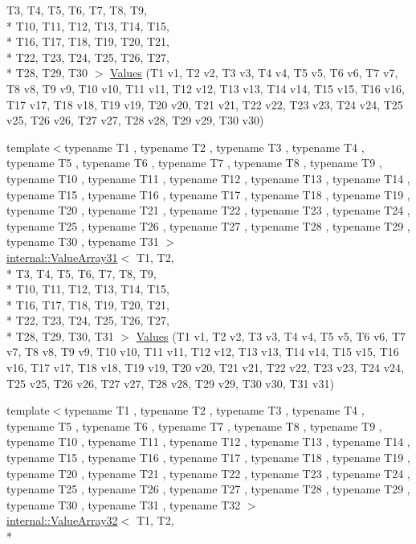 \begin{DoxyCompactItemize}
T3, T4, T5, T6, T7, T8, T9, \\*
T10, T11, T12, T13, T14, T15, \\*
T16, T17, T18, T19, T20, T21, \\*
T22, T23, T24, T25, T26, T27, \\*
T28, T29, T30 $>$ \hyperlink{namespacetesting_a016767be70ad0412bdbf837bc4d3ca98}{Values} (T1 v1, T2 v2, T3 v3, T4 v4, T5 v5, T6 v6, T7 v7, T8 v8, T9 v9, T10 v10, T11 v11, T12 v12, T13 v13, T14 v14, T15 v15, T16 v16, T17 v17, T18 v18, T19 v19, T20 v20, T21 v21, T22 v22, T23 v23, T24 v24, T25 v25, T26 v26, T27 v27, T28 v28, T29 v29, T30 v30)
\item 
{\footnotesize template$<$typename T1 , typename T2 , typename T3 , typename T4 , typename T5 , typename T6 , typename T7 , typename T8 , typename T9 , typename T10 , typename T11 , typename T12 , typename T13 , typename T14 , typename T15 , typename T16 , typename T17 , typename T18 , typename T19 , typename T20 , typename T21 , typename T22 , typename T23 , typename T24 , typename T25 , typename T26 , typename T27 , typename T28 , typename T29 , typename T30 , typename T31 $>$ }\\\hyperlink{classtesting_1_1internal_1_1ValueArray31}{internal\-::\-Value\-Array31}$<$ T1, T2, \\*
T3, T4, T5, T6, T7, T8, T9, \\*
T10, T11, T12, T13, T14, T15, \\*
T16, T17, T18, T19, T20, T21, \\*
T22, T23, T24, T25, T26, T27, \\*
T28, T29, T30, T31 $>$ \hyperlink{namespacetesting_a40d9696e1754455c8329a866c17ed7bb}{Values} (T1 v1, T2 v2, T3 v3, T4 v4, T5 v5, T6 v6, T7 v7, T8 v8, T9 v9, T10 v10, T11 v11, T12 v12, T13 v13, T14 v14, T15 v15, T16 v16, T17 v17, T18 v18, T19 v19, T20 v20, T21 v21, T22 v22, T23 v23, T24 v24, T25 v25, T26 v26, T27 v27, T28 v28, T29 v29, T30 v30, T31 v31)
\item 
{\footnotesize template$<$typename T1 , typename T2 , typename T3 , typename T4 , typename T5 , typename T6 , typename T7 , typename T8 , typename T9 , typename T10 , typename T11 , typename T12 , typename T13 , typename T14 , typename T15 , typename T16 , typename T17 , typename T18 , typename T19 , typename T20 , typename T21 , typename T22 , typename T23 , typename T24 , typename T25 , typename T26 , typename T27 , typename T28 , typename T29 , typename T30 , typename T31 , typename T32 $>$ }\\\hyperlink{classtesting_1_1internal_1_1ValueArray32}{internal\-::\-Value\-Array32}$<$ T1, T2, \\*

\end{DoxyCompactItemize}

